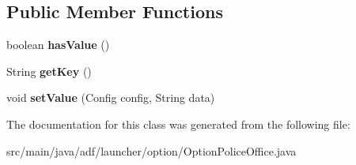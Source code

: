\subsection*{Public Member Functions}
\begin{DoxyCompactItemize}
\item 
\hypertarget{classadf_1_1launcher_1_1option_1_1OptionPoliceOffice_a1f4a4e91437beeb89918e9b186b31f60}{}\label{classadf_1_1launcher_1_1option_1_1OptionPoliceOffice_a1f4a4e91437beeb89918e9b186b31f60} 
boolean {\bfseries has\+Value} ()
\item 
\hypertarget{classadf_1_1launcher_1_1option_1_1OptionPoliceOffice_aa6fc4229aaf8fabaf5cb3d5dbcca8a4b}{}\label{classadf_1_1launcher_1_1option_1_1OptionPoliceOffice_aa6fc4229aaf8fabaf5cb3d5dbcca8a4b} 
String {\bfseries get\+Key} ()
\item 
\hypertarget{classadf_1_1launcher_1_1option_1_1OptionPoliceOffice_ade4e72277cbf70e03f728830dfb0fb0f}{}\label{classadf_1_1launcher_1_1option_1_1OptionPoliceOffice_ade4e72277cbf70e03f728830dfb0fb0f} 
void {\bfseries set\+Value} (Config config, String data)
\end{DoxyCompactItemize}


The documentation for this class was generated from the following file\+:\begin{DoxyCompactItemize}
\item 
src/main/java/adf/launcher/option/Option\+Police\+Office.\+java\end{DoxyCompactItemize}
